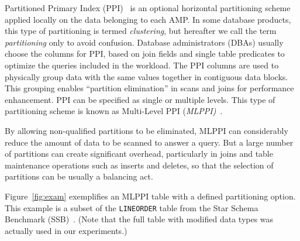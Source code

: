 \documentclass[runningheads]{comsis2}
\begin{document}
Partitioned Primary Index (PPI)~\cite{sinclair:ppi} is an optional horizontal 
partitioning scheme applied locally on the data belonging to each AMP. 
In some database products, this type of partitioning is termed {\em clustering}, 
but hereafter we call the term \hbox{{\em partitioning}} only to avoid confusion.
Database \hbox{administrators} (DBAs) usually choose the columns for PPI, 
based on join fields and single table \hbox{predicates} to optimize the queries included 
in the workload. 
The PPI columns are used to physically group data with the same values 
together in contiguous data blocks. 
This grouping enables ``partition elimination'' in scans and joins for performance enhancement.
PPI can be specified as single or multiple levels. 
This type of partitioning scheme is known as 
\hbox{Multi-Level} PPI ({\em MLPPI)}~\cite{klindt09mlppi}.

By allowing non-qualified partitions to be eliminated, MLPPI can considerably 
reduce the amount of data to be scanned to answer a query. 
But a large number of partitions can create significant overhead, 
particularly in joins and table maintenance operations 
such as inserts and deletes, so that the selection of partitions can be usually a balancing act. 

Figure~\ref{fig:exam} exemplifies an MLPPI table with a defined partitioning option. 
This example is a subset of the {\tt LINEORDER} table from the Star Schema Benchmark (SSB)~\cite{oneil:ssb}. 
(Note that the full table with modified data types was actually used in our experiments.)
\end{document}
